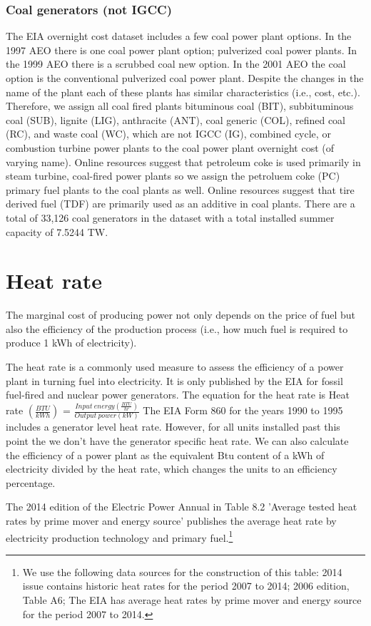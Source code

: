 \documentclass[10pt]{amsart}
\begin{document}
\subsubsection{Coal generators (not IGCC)}
The EIA overnight cost dataset includes a few coal power plant options. 
In the 1997 AEO there is one coal power plant option; pulverized coal power plants.
In the 1999 AEO there is a scrubbed coal new option. 
In the 2001 AEO the coal option is the conventional pulverized coal power plant.
Despite the changes in the name of the plant each of these plants has similar characteristics (i.e., cost, etc.).
Therefore, we assign all coal fired plants bituminous coal (BIT), subbituminous coal (SUB), lignite (LIG), anthracite (ANT), coal generic (COL), refined coal (RC), and waste coal (WC), which are not IGCC (IG), combined cycle, or combustion turbine power plants to the coal power plant overnight cost (of varying name).
Online resources suggest that petroleum coke is used primarily in steam turbine, coal-fired power plants so we assign the petroluem coke (PC) primary fuel plants to the coal plants as well.  
Online resources suggest that tire derived fuel (TDF) are primarily used as an additive in coal plants. 
There are a total of 33,126 coal generators in the dataset with a total installed summer capacity of 7.5244 TW. 

\section{Heat rate}
The marginal cost of producing power not only depends on the price of fuel but also the efficiency of the production process (i.e., how much fuel is required to produce 1 kWh of electricity). 

The heat rate is a commonly used measure to assess the efficiency of a power plant in turning fuel into electricity. 
It is only published by the EIA for fossil fuel-fired and nuclear power generators. 
The equation for the heat rate is Heat rate $(\frac{BTU}{kWh})$ = $\frac{Input\ energy (\frac{BTU}{hr})}{Output\ power (kW)}$ 
The EIA Form 860 for the years 1990 to 1995 includes a generator level heat rate. 
However, for all units installed past this point the we don't have the generator specific heat rate. 
We can also calculate the efficiency of a power plant as the equivalent Btu content of a kWh of electricity divided by the heat rate, which changes the units to an efficiency percentage.

The 2014 edition of the Electric Power Annual in Table 8.2 'Average tested heat rates by prime mover and energy source' publishes the average heat rate by electricity production technology and primary fuel.\footnote{We use the following data sources for the construction of this table: 2014 issue contains historic heat rates for the period 2007 to 2014; 2006 edition, Table A6;  
The EIA has average heat rates by prime mover and energy source for the period 2007 to 2014.} 
\end{document}

